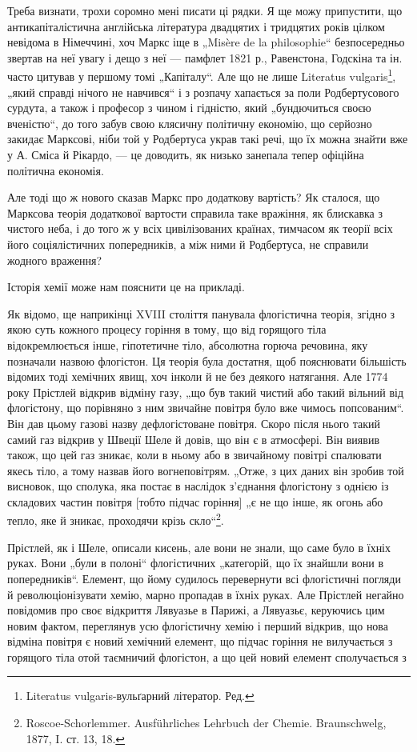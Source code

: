 Треба визнати, трохи соромно мені писати ці рядки. Я ще можу
припустити, що антикапіталістична англійська література двадцятих і
тридцятих років цілком невідома в Німеччині, хоч Маркс іще в „Misère
de la philosophie“ безпосередньо звертав на неї увагу і дещо з неї —
памфлет 1821 р., Равенстона, Годскіна та ін. часто цитував у першому
томі „Капіталу“. Але що не лише Literatus vulgaris\footnote*{
Literatus vulgaris-вульґарний літератор. Ред.
}, „який справді
нічого не навчився“ і з розпачу хапається за поли Родбертусового сурдута,
а також і професор з чином і гідністю, який „бундючиться
своєю вченістю“, до того забув свою клясичну політичну економію, що
серйозно закидає Марксові, ніби той у Родбертуса украв такі речі, що
їх можна знайти вже у А. Сміса й Рікардо, — це доводить, як низько
занепала тепер офіційна політична економія.

Але тоді що ж нового сказав Маркс про додаткову вартість? Як
сталося, що Марксова теорія додаткової вартости справила таке вражіння,
як блискавка з чистого неба, і до того ж у всіх цивілізованих країнах,
тимчасом як теорії всіх його соціялістичних попередників, а між ними й
Родбертуса, не справили жодного враження?

Історія хемії може нам пояснити це на прикладі.

Як відомо, ще наприкінці XVIII століття панувала флогістична теорія,
згідно з якою суть кожного процесу горіння в тому, що від горящого
тіла відокремлюється інше, гіпотетичне тіло, абсолютна горюча речовина,
яку позначали назвою флогістон. Ця теорія була достатня, щоб пояснювати
більшість відомих тоді хемічних явищ, хоч інколи й не без деякого
натягання. Але 1774 року Прістлей відкрив відміну газу, „що був такий
чистий або такий вільний від флогістону, що порівняно з ним звичайне
повітря було вже чимось попсованим“. Він дав цьому газові назву дефлогістоване
повітря. Скоро після нього такий самий газ відкрив у Швеції
Шеле й довів, що він є в атмосфері. Він виявив також, що цей газ
зникає, коли в ньому або в звичайному повітрі спалювати якесь тіло, а
тому назвав його вогнеповітрям. „Отже, з цих даних він зробив той
висновок, що сполука, яка постає в наслідок з’єднання флогістону з
однією із складових частин повітря [тобто підчас горіння] „є не що
інше, як огонь або тепло, яке й зникає, проходячи крізь скло“\footnote{
Roscoe-Schorlemmer. Ausführliches Lehrbuch der Chemie. Braunschwelg, 1877,
I. ст. 13, 18.
}.

Прістлей, як і Шеле, описали кисень, але вони не знали, що саме
було в їхніх руках. Вони „були в полоні“ флогістичних „категорій, що
їх знайшли вони в попередників“. Елемент, що йому судилось перевернути
всі флогістичні погляди й революціонізувати хемію, марно пропадав
в їхніх руках. Але Прістлей негайно повідомив про своє відкриття
Лявуазье в Парижі, а Лявуазьє, керуючись цим новим фактом, переглянув
усю флогістичну хемію і перший відкрив, що нова відміна повітря
є новий хемічний елемент, що підчас горіння не вилучається з горящого
тіла отой таємничий флогістон, а що цей новий елемент сполучається з
\parbreak{}  %

